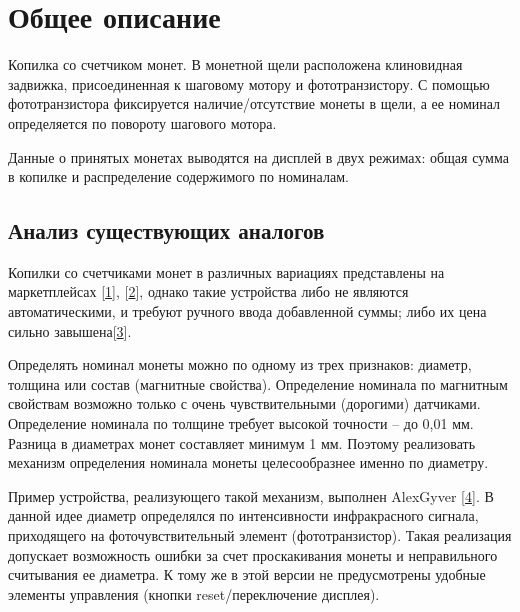 \section {Общее описание}

Копилка со счетчиком монет. В монетной щели расположена клиновидная задвижка, присоединенная к шаговому мотору и фототранзистору. С помощью фототранзистора фиксируется наличие/отсутствие монеты в щели, а ее номинал определяется по повороту шагового мотора.
\par\medskip

Данные о принятых монетах выводятся на дисплей в двух режимах: общая сумма в копилке и распределение содержимого по номиналам.

\subsection {Анализ существующих аналогов}

Копилки со счетчиками монет в различных вариациях представлены на маркетплейсах [\href{https://www.ozon.ru/product/yilijukj-kopilka-dlya-deneg-11h20-sm-1358489566/?asb=sCr1GmIlWB7Fjby%252BPYnWUNFeAjvdIw5ordlD0iRvbOM%253D&asb2=sn4m9gpYWZy_EEZH7OfMzDGoCOjFWmDehfvE83sshNuqVbbHLKnkaqdBme_UnwQL9zPGT5WB-Cli3HsA9FpOcg&avtc=1&avte=2&avts=1717862839&keywords=копилка+счетчик}{1}], [\href{https://aliexpress.ru/item/1005002928697666.html?sku_id=12000028995331515&spm=a2g2w.productlist.search_results.1.5d644f98Nvin2D}{2}], однако такие устройства либо не являются автоматическими, и требуют ручного ввода добавленной суммы; либо их цена сильно завышена[\href{https://www.ozon.ru/product/schetchik-i-sortirovshchik-monet-cassida-coinmax-1324388430/?asb=FCEZ8bYDzfLDlR1hbPXsPN7zg5D8DCyINZKx%252ByUJkgQ%253D&asb2=pFy0DP03AN1Um2JNqhlwAfVK8Tqf4HIHittgnkgxfxYFRn3HUd_mHS4O0_9rIrPfWd8S0KDwvHJyzVXS0PcbQw&avtc=1&avte=2&avts=1718018978&keywords=cassida+%D0%BC%D0%BE%D0%BD%D0%B5%D1%82%D1%8B}{3}].
\par\medskip

Определять номинал монеты можно по одному из трех признаков: диаметр, толщина или состав (магнитные свойства). Определение номинала по магнитным свойствам возможно только с очень чувствительными (дорогими) датчиками. Определение номинала по толщине требует высокой точности -- до 0,01 мм. Разница в диаметрах монет составляет минимум 1 мм. Поэтому реализовать механизм определения номинала монеты целесообразнее именно по диаметру.
\par\medskip

Пример устройства, реализующего такой механизм, выполнен AlexGyver [\href{https://www.youtube.com/watch?v=lH4qfGlK2Qk}{4}]. В данной идее диаметр определялся по интенсивности инфракрасного сигнала, приходящего на фоточувствительный элемент (фототранзистор).  Такая реализация допускает возможность ошибки за счет проскакивания монеты и неправильного считывания ее диаметра. К тому же в этой версии не предусмотрены удобные элементы управления (кнопки reset/переключение дисплея).
\par\medskip

